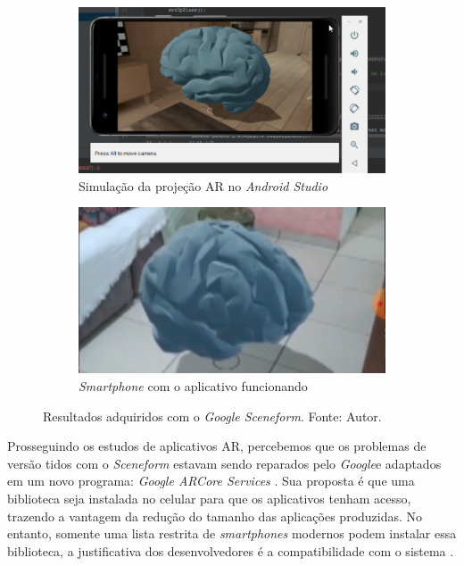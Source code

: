 \begin{figure}[ht]
\centering
    \begin{subfigure}{.45\textwidth}
        \centering
        \includegraphics[width=.95\textwidth]{figuras/sceneform.png}
        \caption{Simulação da projeção AR no \textit{Android Studio}}
        \label{fig:sceneform-sim}
    \end{subfigure}
    \begin{subfigure}{.45\textwidth}
        \centering
        \includegraphics[width=.95\textwidth]{figuras/sceneformAR.png}
        \caption{\textit{Smartphone} com o aplicativo funcionando}
        \label{fig:sceneform-real}
    \end{subfigure}
    \caption{Resultados adquiridos com o \textit{Google Sceneform}. Fonte: Autor.}
    \label{fig:sceneform-tests}
\end{figure}

Prosseguindo os estudos de aplicativos AR, percebemos que os problemas de versão tidos com o \textit{Sceneform} estavam sendo reparados pelo \textit{Google}e adaptados em um novo programa: \textit{Google ARCore Services} \cite{arcore-googleplay}. Sua proposta é que uma biblioteca seja instalada no celular para que os aplicativos tenham acesso, trazendo a vantagem da redução do tamanho das aplicações produzidas. No entanto, somente uma lista restrita de \textit{smartphones} modernos podem instalar essa biblioteca, a justificativa dos desenvolvedores é a compatibilidade com o sistema \cite{arcore-list}.

